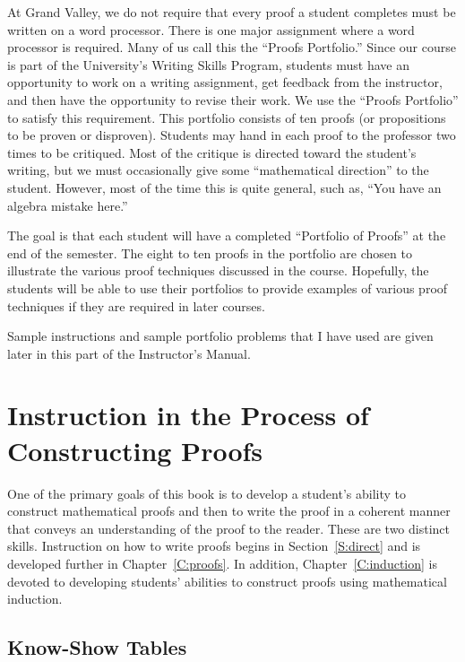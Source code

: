 At Grand Valley, we do not require that every proof a student completes must be written on a word processor.  There is one major assignment where a word processor is required.  Many of us call this the ``Proofs Portfolio.''  Since our course is part of the University's Writing Skills Program, students must have an opportunity to work on a writing assignment, get feedback from the instructor, and then have the opportunity to revise their work.  We use the ``Proofs Portfolio'' to satisfy this requirement.  This portfolio consists of ten proofs (or propositions to be proven or disproven).  Students may hand in each proof to the professor two times to be critiqued.  Most of the critique is directed toward the student's writing, but we must occasionally give some ``mathematical direction'' to the student.  However, most of the time this is quite general, such as, ``You have an algebra mistake here.''

\vskip6pt
The goal is that each student will have a completed ``Portfolio of Proofs'' at the end of the semester.  The eight to ten proofs in the portfolio are chosen to illustrate the various proof techniques discussed in the course.  Hopefully, the students will be able to use their portfolios to provide examples of various proof techniques if they are required in later courses.

\vskip6pt
Sample instructions and sample portfolio problems that I have used are given later in this part of the Instructor's Manual.
\hbreak


\section*{Instruction in the Process of Constructing Proofs}

One of the primary goals of this book is to develop a student's ability to construct mathematical proofs and then to write the proof in a coherent manner that conveys an understanding of the proof to the reader.  These are two distinct skills.  Instruction on how to write proofs begins in Section~\ref{S:direct} and is developed further in Chapter~\ref{C:proofs}.  In addition, Chapter~\ref{C:induction} is devoted to developing students' abilities to construct proofs using mathematical induction.  

\subsection*{Know-Show Tables}


